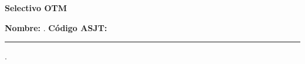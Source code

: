 \begin{center} \textbf
{
        {\Large Selectivo OTM} \\ \vspace{2mm}{\large Quinto Nivel}
}
\end{center}

\textbf{Nombre:} \hrulefill. \textbf{ Código ASJT:} \rule{2cm}{0.1mm}.
\vspace{-4mm}

